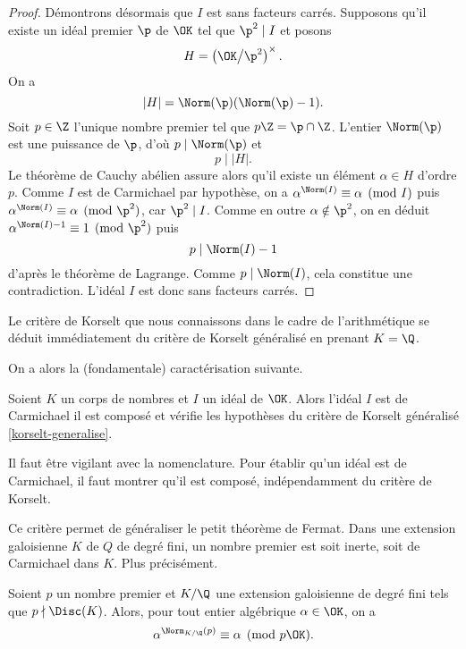 \begin{proof}
	Démontrons désormais que $I$ est sans facteurs carrés. Supposons qu'il existe un idéal premier $\p$ de $\OK$ tel que $\p^2\mid I$ et posons \[H = \left(\OK\big/\p^2\right)^\times.\] On a \[\left|H\right| = \Norm(\p)(\Norm(\p) - 1).\] Soit $p\in \Z$ l'unique nombre premier tel que $p\Z = \p\cap \Z$. L'entier $\Norm(\p)$ est une puissance de $\p$, d'où $p\mid \Norm(\p)$ et \[p\mid \left| H \right|.\] Le théorème de Cauchy abélien assure alors qu'il existe un élément $\alpha \in H$ d'ordre $p$. Comme $I$ est de Carmichael par hypothèse, on a $\alpha^{\Norm(I)}\equiv \alpha \pmod{I}$ puis $\alpha^{\Norm(I)} \equiv \alpha \pmod{\p^2}$, car $\p^2\mid I$. Comme en outre $\alpha\notin \p^2$, on en déduit $\alpha^{\Norm(I) - 1} \equiv 1 \pmod{\p^2}$ puis \[p \mid \Norm(I) - 1\] d'après le théorème de Lagrange. Comme $p\mid \Norm(I)$, cela constitue une contradiction. L'idéal $I$ est donc sans facteurs carrés.
\end{proof}

\begin{remarque}
	Le critère de Korselt que nous connaissons dans le cadre de l'arithmétique se déduit immédiatement du critère de Korselt généralisé en prenant $K=\Q$.
\end{remarque}

On a alors la (fondamentale) caractérisation suivante.

\begin{corollaire}\label{carac-korselt}
	Soient $K$ un corps de nombres et $I$ un idéal de $\OK$. Alors l'idéal $I$ est de Carmichael \ssi il est composé et vérifie les hypothèses du critère de Korselt généralisé \ref{korselt-generalise}.
\end{corollaire}

\begin{remarque}
	Il faut être vigilant avec la nomenclature. Pour établir qu'un idéal est de Carmichael, il faut montrer qu'il est composé, indépendamment du critère de Korselt.
\end{remarque}

Ce critère permet de généraliser le petit théorème de Fermat. Dans une extension galoisienne $K$ de $Q$ de degré fini, un nombre premier est soit inerte, soit de Carmichael dans $K$. Plus précisément.

\begin{theoreme}\label{ptf}
	Soient $p$ un nombre premier et $K/\Q$ une extension galoisienne de degré fini tels que $p\nmid \Disc(K)$. Alors, pour tout entier algébrique $\alpha \in \OK$, on a $$\alpha^{\Norm_{K/\Q}(p)} \equiv \alpha \pmod{p\OK}.$$
\end{theoreme}

